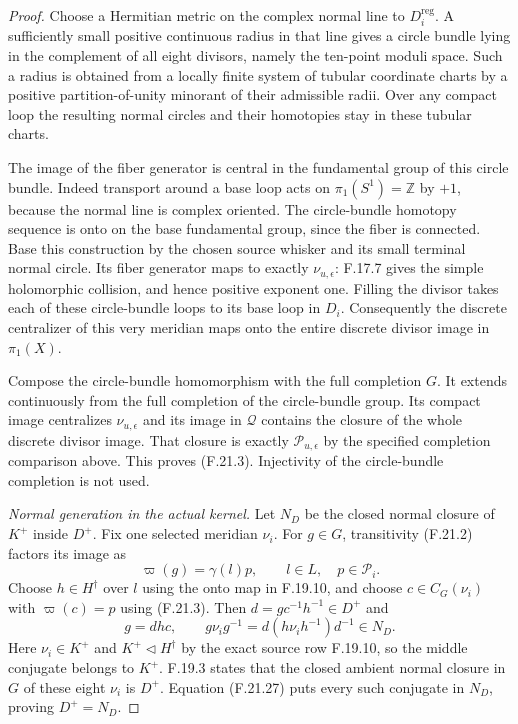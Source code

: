 \begin{proof}
Choose a Hermitian metric on the complex normal
line to $D_i^{\mathrm{reg}}$. A sufficiently small
positive continuous radius in that line gives
a circle bundle lying in the complement of all
eight divisors, namely the ten-point moduli space.
Such a radius is obtained from a locally finite
system of tubular coordinate charts by a positive
partition-of-unity minorant of their admissible
radii. Over any compact loop the resulting
normal circles and their homotopies stay in
these tubular charts.

The image of the fiber generator is central
in the fundamental group of this circle bundle.
Indeed transport around a base loop acts on
$\pi_1(S^1)=\mathbb Z$ by $+1$, because the normal
line is complex oriented. The circle-bundle
homotopy sequence is onto on the base fundamental
group, since the fiber is connected.
Base this construction by the chosen source
whisker and its small terminal normal circle.
Its fiber generator maps to exactly
$\nu_{u,\epsilon}$: F.17.7 gives the simple
holomorphic collision, and hence positive exponent
one. Filling the divisor takes each of these
circle-bundle loops to its base loop in $D_i$.
Consequently the discrete centralizer of this
very meridian maps onto the entire discrete
divisor image in $\pi_1(X)$.

Compose the circle-bundle homomorphism with the
full completion $G$. It extends continuously
from the full completion of the circle-bundle
group. Its compact image centralizes
$\nu_{u,\epsilon}$ and its image in $\mathcal Q$
contains the closure of the whole discrete
divisor image. That closure is exactly
$\mathcal P_{u,\epsilon}$ by the specified
completion comparison above. This proves
(F.21.3). Injectivity of the circle-bundle
completion is not used.

\emph{Normal generation in the actual kernel.}
Let $N_D$ be the closed normal closure of $K^+$
inside $D^+$. Fix one selected meridian $\nu_i$.
For $g\in G$, transitivity (F.21.2) factors its
image as
\[
                 \varpi(g)=\gamma(l)p,
          \qquad l\in L,\quad p\in\mathcal P_i.
\]
Choose $h\in H^\dagger$ over $l$ using the onto
map in F.19.10, and choose
$c\in C_G(\nu_i)$ with $\varpi(c)=p$ using
(F.21.3). Then $d=g c^{-1}h^{-1}\in D^+$ and
\[
                  g=d h c,
       \qquad g\nu_i g^{-1}=d(h\nu_i h^{-1})d^{-1}\in N_D.
                                                               \tag{F.21.27}
\]
Here $\nu_i\in K^+$ and $K^+\triangleleft H^\dagger$
by the exact source row F.19.10, so the middle
conjugate belongs to $K^+$.
F.19.3 states that the closed ambient normal
closure in $G$ of these eight $\nu_i$ is $D^+$.
Equation (F.21.27) puts every such conjugate in
$N_D$, proving $D^+=N_D$.


\end{proof}
